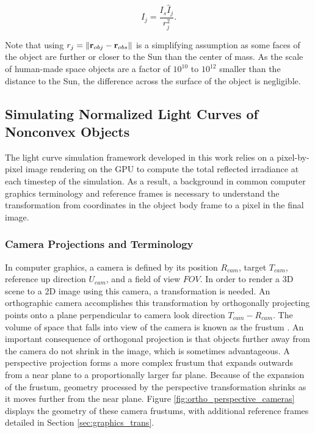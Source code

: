 \begin{equation} \label{eq:lc_func_norm_to_irrad}
  I_{j} = \frac{I_s \hat{I}_j}{r_j^2}.
\end{equation}

Note that using $r_j = \| \mathbf{r}_{obj} - \mathbf{r}_{obs} \|$ is a simplifying assumption as some faces of the object are further or closer to the Sun than the center of mass. As the scale of human-made space objects are a factor of $10^{10}$ to $10^{12}$ smaller than the distance to the Sun, the difference across the surface of the object is negligible.


\subsection{Simulating Normalized Light Curves of Nonconvex Objects}

The light curve simulation framework developed in this work relies on a pixel-by-pixel image rendering on the GPU to compute the total reflected irradiance at each timestep of the simulation. As a result, a background in common computer graphics terminology and reference frames is necessary to understand the transformation from coordinates in the object body frame to a pixel in the final image.

\subsubsection{Camera Projections and Terminology}

In computer graphics, a camera is defined by its position $R_{cam}$, target $T_{cam}$, reference up direction $U_{cam}$, and a field of view $FOV$. In order to render a 3D scene to a 2D image using this camera, a transformation is needed. An orthographic camera accomplishes this transformation by orthogonally projecting points onto a plane perpendicular to camera look direction $T_{cam} - R_{cam}$. The volume of space that falls into view of the camera is known as the frustum \cite{shirley2009}. An important consequence of orthogonal projection is that objects further away from the camera do not shrink in the image, which is sometimes advantageous. A perspective projection forms a more complex frustum that expands outwards from a near plane to a proportionally larger far plane. Because of the expansion of the frustum, geometry processed by the perspective transformation shrinks as it moves further from the near plane. Figure \ref{fig:ortho_perspective_cameras} displays the geometry of these camera frustums, with additional reference frames detailed in Section \ref{sec:graphics_trans}.

